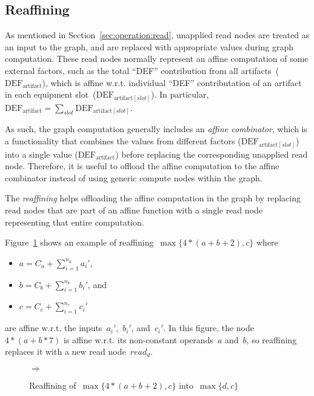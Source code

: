 \documentclass{article}
\DeclareMathOperator{\readNode}{read}
\begin{document}
\subsection{Reaffining}

As mentioned in Section~\ref{sec:operation:read}, unapplied read nodes are treated as an input to the graph, and are replaced with appropriate values during graph computation.
These read nodes normally represent an affine computation of some external factors, such as the total ``DEF'' contribution from all artifacts~($\text{DEF}_\text{artifact}$), which is affine w.r.t. individual ``DEF'' contributation of an artifact in each equipment slot~($\text{DEF}_{\text{artifact}[slot]}$).
In particular, $\text{DEF}_\text{artifact} = \sum_{slot} \text{DEF}_{\text{artifact}[slot]}$.

As such, the graph computation generally includes an \emph{affine combinator}, which is a functionality that combines the values from different factors ($\text{DEF}_{\text{artifact}[slot]}$) into a single value ($\text{DEF}_\text{artifact}$) before replacing the corresponding unapplied read node.
Therefore, it is useful to offload the affine computation to the affine combinator instead of using generic compute nodes within the graph.

The \emph{reaffining} helps offloading the affine computation in the graph by replacing read nodes that are part of an affine function with a single read node representing that entire computation.

Figure~\ref{fig:optimization:reaffine} shows an example of reaffining~$\max\{4 * (a + b + 2), c\}$ where
\begin{itemize}
	\item $a=C_a + \sum_{i=1}^{n_a}a_i'$,
	\item $b=C_b + \sum_{i=1}^{n_b}b_i'$, and
	\item $c=C_c + \sum_{i=1}^{n_c}c_i'$
\end{itemize}
are affine w.r.t. the inputs~${a_i'}$,~$b_i'$, and~$c_i'$.
In this figure, the node~$4 * (a + b * 7)$ is affine w.r.t. its non-constant operands~$a$ and~$b$, so reaffining replaces it with a new read node~$read_d$.
%
\begin{figure}
	\centering
	\quad$\Rightarrow$\quad
	\caption{Reaffining of~$\max\{4 * (a + b + 2), c\}$ into~$\max\{d, c\}$}
	\label{fig:optimization:reaffine}
\end{figure}
\end{document}

